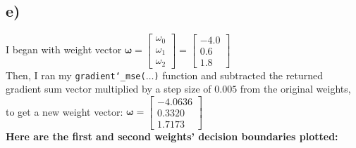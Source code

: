 \documentclass{article} %
\newcommand{\us}{\char`_}
\begin{document}
\subsection*{e)}
I began with weight vector $\boldsymbol{\omega}=\begin{bmatrix}\omega_{0}\\\omega_{1}\\\omega_{2}\end{bmatrix}=\begin{bmatrix}-4.0\\0.6\\1.8\end{bmatrix}$\\
\linebreak
Then, I ran my \texttt{gradient\us mse($\hdots$)} function and subtracted the returned gradient sum vector multiplied by a step size of $0.005$ from the original weights, to get a new weight vector: $\boldsymbol{\omega}=\begin{bmatrix}-4.0636\\0.3320\\1.7173\end{bmatrix}$\\
\linebreak
\textbf{Here are the first and second weights' decision boundaries plotted:}
\end{document}
